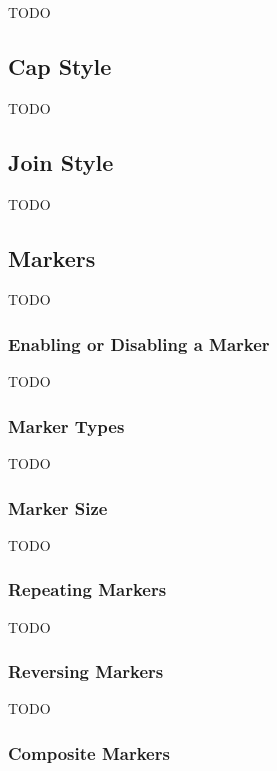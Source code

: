 TODO


\subsection{Cap Style}\label{sec:capstyle}

TODO


\subsection{Join Style}\label{sec:joinstyle}

TODO


\subsection{Markers}\label{sec:markers}

TODO


\subsubsection{Enabling or Disabling a Marker}\label{sec:enablingmarkers}

TODO


\subsubsection{Marker Types}\label{sec:markertypes}

TODO


\subsubsection{Marker Size}\label{sec:markersize}

TODO


\subsubsection{Repeating Markers}\label{sec:repeatingmarkers}

TODO


\subsubsection{Reversing Markers}\label{sec:reversingmarkers}

TODO


\subsubsection{Composite Markers}\label{sec:compositemarkers}

